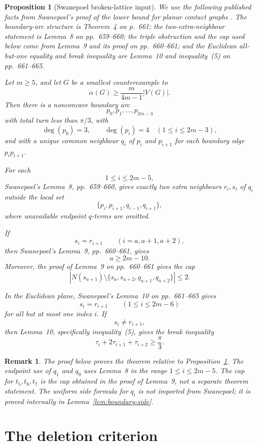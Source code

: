 \documentclass[11pt]{article}
\newtheorem{proposition}[theorem]{Proposition}
\newtheorem{remark}[theorem]{Remark}
\begin{document}
\begin{proposition}[Swanepoel broken-lattice input]\label{prop:SwanepoelInput}
We use the following published facts from Swanepoel's proof of the lower bound for planar contact graphs \cite[pp.~649--670]{Swanepoel2002}. The boundary-arc structure is Theorem~4 on p.~661; the two-extra-neighbour statement is Lemma~8 on pp.~659--660; the triple obstruction and the cap used below come from Lemma~9 and its proof on pp.~660--661; and the Euclidean all-but-one equality and break inequality are Lemma~10 and inequality~(5) on pp.~661--665.

Let $m\ge 5$, and let $G$ be a smallest counterexample to
\[
 \alpha(G)\ge \frac{m}{4m-1}|V(G)|.
\]
Then there is a nonconcave boundary arc
\[
 p_0,p_1,\ldots,p_{2m-3}
\]
with total turn less than $\pi/3$, with
\[
 \deg(p_0)=3,
 \qquad
 \deg(p_i)=4\quad(1\le i\le 2m-3),
\]
and with a unique common neighbour $q_i$ of $p_i$ and $p_{i+1}$ for each boundary edge $p_ip_{i+1}$.

For each
\[
 1\le i\le 2m-5,
\]
Swanepoel's Lemma~8, pp.~659--660, gives exactly two extra neighbours $r_i,s_i$ of $q_i$ outside the local set
\[
 \{p_i,p_{i+1},q_{i-1},q_{i+1}\},
\]
where unavailable endpoint $q$-terms are omitted.

If
\[
 s_i=r_{i+1}\qquad(i=a,a+1,a+2),
\]
then Swanepoel's Lemma~9, pp.~660--661, gives
\[
 a\ge 2m-10.
\]
Moreover, the proof of Lemma~9 on pp.~660--661 gives the cap
\[
 \left|N(s_{a+1})\setminus\{s_a,s_{a+2},q_{a+1},q_{a+2}\}\right|\le 2.
\]

In the Euclidean plane, Swanepoel's Lemma~10 on pp.~661--665 gives
\[
 s_i=r_{i+1}\qquad(1\le i\le 2m-6)
\]
for all but at most one index $i$. If
\[
 s_i\ne r_{i+1},
\]
then Lemma~10, specifically inequality~(5), gives the break inequality
\[
 \tau_i+2\tau_{i+1}+\tau_{i+2}\ge \frac{\pi}{3}.
\]
\end{proposition}

\begin{remark}
The proof below proves the theorem relative to Proposition~\ref{prop:SwanepoelInput}. The endpoint use of $q_1$ and $q_9$ uses Lemma~8 in the range $1\le i\le 2m-5$. The cap for $t_5,t_6,t_7$ is the cap obtained in the proof of Lemma~9, not a separate theorem statement. The uniform side formula for $q_i$ is not imported from Swanepoel; it is proved internally in Lemma~\ref{lem:boundary-side}.
\end{remark}

\section{The deletion criterion}
\end{document}
